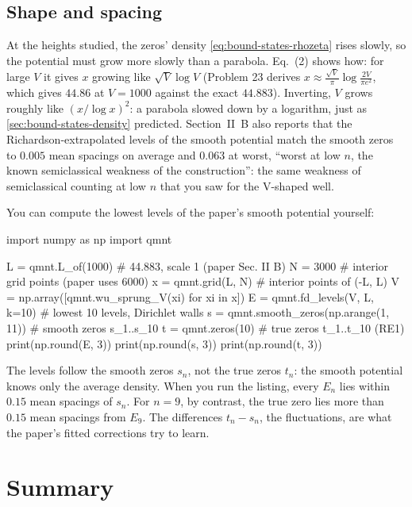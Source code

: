 \subsection{Shape and spacing}

At the heights studied, the zeros' density \cref{eq:bound-states-rhozeta} rises slowly, so the potential must grow more slowly than a parabola. Eq.~(2) shows how: for large $V$ it gives $x$ growing like $\sqrt V\log V$ (Problem 23 derives $x\approx\frac{\sqrt V}{\pi}\log\frac{2V}{\pi e^2}$, which gives $44.86$ at $V=1000$ against the exact $44.883$). Inverting, $V$ grows roughly like $(x/\log x)^2$: a parabola slowed down by a logarithm, just as \cref{sec:bound-states-density} predicted. Section~II~B also reports that the Richardson-extrapolated levels of the smooth potential match the smooth zeros to $0.005$ mean spacings on average and $0.063$ at worst, ``worst at low $n$, the known semiclassical weakness of the construction'': the same weakness of semiclassical counting at low $n$ that you saw for the V-shaped well.

You can compute the lowest levels of the paper's smooth potential yourself:

\begin{pycode}
import numpy as np
import qmnt

L = qmnt.L_of(1000)            # 44.883, scale 1 (paper Sec. II B)
N = 3000                       # interior grid points (paper uses 6000)
x = qmnt.grid(L, N)            # interior points of (-L, L)
V = np.array([qmnt.wu_sprung_V(xi) for xi in x])
E = qmnt.fd_levels(V, L, k=10) # lowest 10 levels, Dirichlet walls
s = qmnt.smooth_zeros(np.arange(1, 11))  # smooth zeros s_1..s_10
t = qmnt.zeros(10)             # true zeros t_1..t_10 (RE1)
print(np.round(E, 3))
print(np.round(s, 3))
print(np.round(t, 3))
\end{pycode}

The levels follow the smooth zeros $s_n$, not the true zeros $t_n$: the smooth potential knows only the average density. When you run the listing, every $E_n$ lies within $0.15$ mean spacings of $s_n$. For $n=9$, by contrast, the true zero lies more than $0.15$ mean spacings from $E_9$. The differences $t_n-s_n$, the fluctuations, are what the paper's fitted corrections try to learn.

\section{Summary}\label{sec:bound-states-summary}

